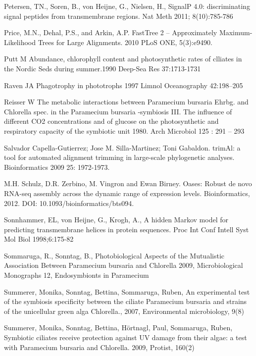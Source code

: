  
\noindent Petersen, TN., Soren, B., von Heijne, G., Nielsen, H., SignalP 4.0: discriminating signal peptides from transmembrane regions. Nat Meth 2011; 8(10):785-786

 
\noindent Price, M.N., Dehal, P.S., and Arkin, A.P. FastTree 2 -- Approximately Maximum-Likelihood Trees for Large Alignments. 2010 PLoS ONE, 5(3):e9490.

 
\noindent{} Putt M Abundance, chlorophyll content and photosynthetic rates of clliates in the Nordic Seds during summer.1990  Deep-Sea Res 37:1713-1731

 
\noindent Raven JA Phagotrophy in phototrophs 1997 Limnol Oceanography 42:198–205

 
\noindent{} Reisser W  The metabolic interactions between Paramecium bursaria Ehrbg. and Chlorella spec. in the Paramecium bursaria -symbiosis III. The influence of different CO2 concentrations and of glucose on the photosynthetic and respiratory capacity of the symbiotic unit  1980. Arch Microbiol 125 : 291 – 293

 
\noindent Salvador Capella-Gutierrez; Jose M. Silla-Martinez; Toni Gabaldon. trimAl: a tool for automated alignment trimming in large-scale phylogenetic analyses. Bioinformatics 2009 25: 1972-1973.

 
\noindent M.H. Schulz, D.R. Zerbino, M. Vingron and Ewan Birney. Oases: Robust de novo RNA-seq assembly across the dynamic range of expression levels. Bioinformatics, 2012. DOI: 10.1093/bioinformatics/bts094.

 
\noindent Sonnhammer, EL, von Heijne, G., Krogh, A., A hidden Markov model for predicting transmembrane helices in protein sequences. Proc Int Conf Intell Syst Mol Biol 1998;6:175-82

 
\noindent Sommaruga, R., Sonntag, B., Photobiological Aspects of the Mutualistic Association Between Paramecium bursaria and Chlorella 2009, Microbiological Monographs 12, Endosymbionts in Paramecium

 
\noindent Summerer, Monika, Sonntag, Bettina,  Sommaruga, Ruben,  An experimental test of the symbiosis specificity between the ciliate Paramecium bursaria and strains of the unicellular green alga Chlorella., 2007,  Environmental microbiology, 9(8)

 
\noindent Summerer, Monika, Sonntag, Bettina, Hörtnagl, Paul, Sommaruga, Ruben, Symbiotic ciliates receive protection against UV damage from their algae: a test with Paramecium bursaria and Chlorella. 2009,  Protist, 160(2)

